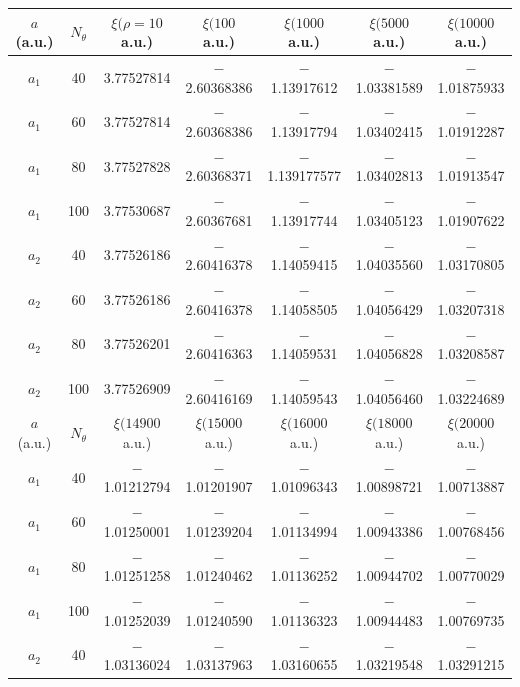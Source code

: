 \begin{table}[h!]
	\centering
	\footnotesize
	\begin{adjustwidth}{-0.1cm}{}
		\tabcolsep=0.10cm
		\begin{tabular}{||c c c c c c c||} 
			\hline
			$a$ (a.u.) & $N_{\theta}$ & $\xi(\rho = 10 $ a.u.) & $\xi(100 $ a.u.) & $\xi(1000 $ a.u.) & $\xi(5000 $ a.u.) & $\xi(10000 $ a.u.)  \Tstrut\Bstrut \\ [0.7ex]
			\hline\hline  \Tstrut\Bstrut 
			$a_1$   & 40  & 3.77527814 & $-$2.60368386 & $-$1.13917612 & $-$1.03381589& $-$1.01875933 \\
			$a_1$   & 60  & 3.77527814 & $-$2.60368386 & $-$1.13917794 & $-$1.03402415& $-$1.01912287\\
			$a_1$   & 80  & 3.77527828 & $-$2.60368371 & $-$1.139177577 & $-$1.03402813 & $-$1.01913547 \\
			$a_1$   & 100  & 3.77530687 & $-$2.60367681 & $-$1.13917744 & $-$1.03405123 & $-$1.01907622 \\ [0.5ex]
			\hline \Tstrut\Bstrut 
			$a_2$   & 40  & 3.77526186 & $-$2.60416378 & $-$1.14059415 & $-$1.04035560 & $-$1.03170805 \\
			$a_2$   & 60  & 3.77526186 & $-$2.60416378 & $-$1.14058505 & $-$1.04056429 & $-$1.03207318 \\
			$a_2$   & 80  & 3.77526201 & $-$2.60416363 & $-$1.14059531 & $-$1.04056828 & $-$1.03208587 \\
			$a_2$   & 100  & 3.77526909 & $-$2.60416169 & $-$1.14059543 & $-$1.04056460 & $-$1.03224689 \\ [0.7ex] 
			\hline
			\hline
			$a$ (a.u.) & $N_{\theta}$ & $\xi(14900 $ a.u.) & $\xi(15000 $ a.u.) & $\xi(16000 $ a.u.) & $\xi(18000 $ a.u.) & $\xi(20000 $ a.u.)  \Tstrut\Bstrut \\ [0.7ex]
			\hline\hline  \Tstrut\Bstrut 
			$a_1$   & 40  & $-$1.01212794 & $-$1.01201907 & $-$1.01096343 & $-$1.00898721& $-$1.00713887 \\
			$a_1$   & 60  & $-$1.01250001& $-$1.01239204 & $-$1.01134994 & $-$1.00943386 & $-$1.00768456 \\
			$a_1$   & 80 & $-$1.01251258 & $-$1.01240462 & $-$1.01136252 & $-$1.00944702 & $-$1.00770029 \\
			$a_1$   & 100  & $-$1.01252039 & $-$1.01240590 & $-$1.01136323 & $-$1.00944483& $-$1.00769735 \\[0.5ex]
			\hline  \Tstrut\Bstrut 
			$a_2$   & 40 & $-$1.03136024 & $-$1.03137963 & $-$1.03160655 & $-$1.03219548 & $-$1.03291215 \\

\end{tabular}
\end{adjustwidth}
\end{table}
